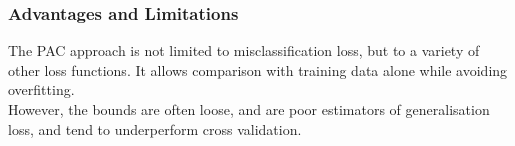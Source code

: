 \subsubsection{Advantages and Limitations}
The PAC approach is not limited to misclassification loss, but to a variety of
other loss functions. It allows comparison with training data alone while
avoiding overfitting.\\

However, the bounds are often loose, and are poor estimators of generalisation
loss, and tend to underperform cross validation.
